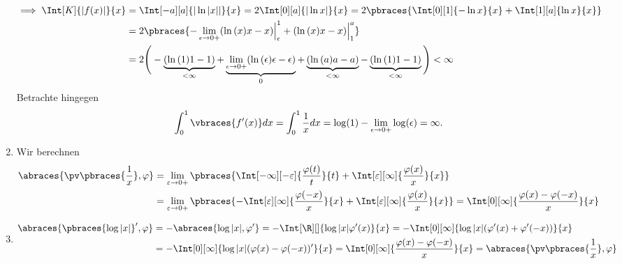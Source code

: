 \begin{solution}
\begin{enumerate}[label = (\roman*)]
    \begin{align*}
        \implies
        \Int[K]{|f(x)|}{x}
        & =
        \Int[-a][a]{|\ln{|x||}}{x}
        =
        2 \Int[0][a]{|\ln{x}|}{x}
        =
        2 \pbraces
        {
            \Int[0][1]{-\ln{x}}{x}
            +
            \Int[1][a]{\ln{x}}{x}
        } \\
        & =
        2 \pbraces
        {
            -
            \lim_{\epsilon \to 0+}
            (\ln{(x)} x - x) \Big|_\epsilon^1
            +
            (\ln{(x)} x - x) \Big|_1^a
        } \\
        & =
        2
        \Bigg (
            -
            \underbrace
            {
                (\ln{(1)} 1 - 1)
            }_{< \infty}
            +
            \underbrace
            {
                \lim_{\epsilon \to 0+}
                (\ln{(\epsilon)} \epsilon - \epsilon)
            }_0
            +
            \underbrace
            {
                (\ln{(a)} a - a)
            }_{< \infty}
            -
            \underbrace
            {
                (\ln{(1)} 1 - 1)
            }_{< \infty}
        \Bigg ) < \infty
	\end{align*}
	Betrachte hingegen 
	\begin{align*}
	\int_0^1 \vbraces{f^\prime(x)} dx = \int_0^1 \frac{1}{x} dx = \log(1) - \lim_{\epsilon \to 0+} \log(\epsilon) = \infty.
	\end{align*}
	\item Wir berechnen
	\begin{align*}
	\abraces{\pv\pbraces{\frac{1}{x}}, \varphi} &= \lim_{\varepsilon \to 0+}
	\pbraces
	{
		\Int[-\infty][-\varepsilon]
		{
			\frac{\varphi(t)}{t}
		}{t}
		+
		\Int[\varepsilon][\infty]
		{
			\frac{\varphi(x)}{x}
		}{x}
	} \\
	&= \lim_{\varepsilon \to 0+}
	\pbraces
	{
	-\Int[\varepsilon][\infty]
	{
		\frac{\varphi(-x)}{x}
	}{x}
	+
	\Int[\varepsilon][\infty]
	{
		\frac{\varphi(x)}{x}
	}{x}
	} = \Int[0][\infty]{\frac{\varphi(x) - \varphi(-x)}{x}}{x}
	\end{align*}
	\item 
	\begin{align*}
	\abraces{\pbraces{\log|x|}^\prime, \varphi} &= -\abraces{\log|x|, \varphi^\prime} = -\Int[\R][]{\log|x| \varphi^\prime(x)}{x} = -\Int[0][\infty]{\log|x| (\varphi^\prime(x) + \varphi^\prime(-x))}{x} \\
	&= -\Int[0][\infty]{\log|x| (\varphi(x) - \varphi(-x))^\prime}{x} = \Int[0][\infty]{\frac{\varphi(x) - \varphi(-x)}{x}}{x} = \abraces{\pv\pbraces{\frac{1}{x}}, \varphi}
	\end{align*}
\end{enumerate}

\end{solution}


